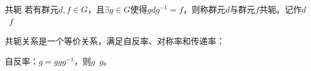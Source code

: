 
\begin{issues}
\issueDraft
\end{issues}
\begin{definition}{共轭}
若有群元$d,f\in G$，且$\exists g\in G$使得$gdg^{-1}=f$，则称群元$d$与群元$f$共轭。记作$d$~$f$
\end{definition}

共轭关系是一个等价关系，满足自反率、对称率和传递率：

自反率：$g=ggg^{-1}$，则$g$~$g$。
